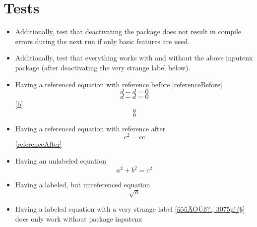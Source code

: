 \documentclass{article}
\begin{document}

	\section*{Tests}
	\begin{itemize}
		\item Additionally, test that deactivating the package does not result in compile errors during the next run if only basic features are used.
		\item Additionally, test that everything works with and without the above inputenx package (after deactivating the very strange label below).
		\item Having a referenced equation with reference before \ref{referenceBefore}
			\begin{equation}\label{referenceBefore}
				d - d = 0
			\end{equation}
			\begin{equation}\label{referenceNo}
				d - d = 0
			\end{equation}
		\ref{b}\begin{equation}\label{a}a\end{equation}\begin{equation}\label{b}b\end{equation}
		\item Having a referenced equation with reference after
			\begin{equation}\label{referenceAfter}
				c^2 = c c
			\end{equation}
			\ref{referenceAfter}
		\item Having an unlabeled equation
			\begin{equation}\label{abc}
				a^2 + b^2 = c^2
			\end{equation}
		\item Having a labeled, but unreferenced equation
			\begin{equation}\label{unreferenced}
				\sqrt{a}
			\end{equation}
		\item Having a labeled equation with a very strange label \ref{äöüÄÖÜß?:, 3075µ!/§} does only work without package inputenx

\end{itemize}
\end{document}
